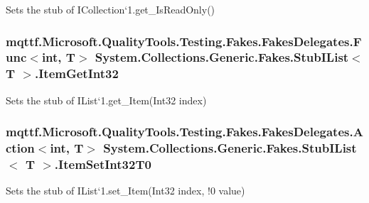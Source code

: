 Sets the stub of I\-Collection`1.get\-\_\-\-Is\-Read\-Only()

\hypertarget{class_system_1_1_collections_1_1_generic_1_1_fakes_1_1_stub_i_list_3_01_t_01_4_aea8a67d7e88c7b260c897cda32e6eff8}{
\subsubsection[{Item\-Get\-Int32}]{\setlength{\rightskip}{0pt plus 5cm}mqttf.\-Microsoft.\-Quality\-Tools.\-Testing.\-Fakes.\-Fakes\-Delegates.\-Func$<$int, T$>$ System.\-Collections.\-Generic.\-Fakes.\-Stub\-I\-List$<$ T $>$.Item\-Get\-Int32}}\label{class_system_1_1_collections_1_1_generic_1_1_fakes_1_1_stub_i_list_3_01_t_01_4_aea8a67d7e88c7b260c897cda32e6eff8}


Sets the stub of I\-List`1.get\-\_\-\-Item(\-Int32 index)

\hypertarget{class_system_1_1_collections_1_1_generic_1_1_fakes_1_1_stub_i_list_3_01_t_01_4_ab1abce653fcffbf693f457418b43b2c7}{
\subsubsection[{Item\-Set\-Int32\-T0}]{\setlength{\rightskip}{0pt plus 5cm}mqttf.\-Microsoft.\-Quality\-Tools.\-Testing.\-Fakes.\-Fakes\-Delegates.\-Action$<$int, T$>$ System.\-Collections.\-Generic.\-Fakes.\-Stub\-I\-List$<$ T $>$.Item\-Set\-Int32\-T0}}\label{class_system_1_1_collections_1_1_generic_1_1_fakes_1_1_stub_i_list_3_01_t_01_4_ab1abce653fcffbf693f457418b43b2c7}


Sets the stub of I\-List`1.set\-\_\-\-Item(Int32 index, !0 value)

